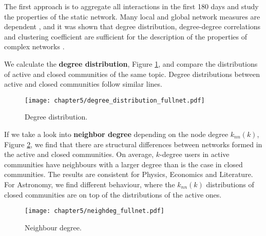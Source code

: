 The first approach is to aggregate all interactions in the first 180 days and study the properties of the static network. Many local and global network measures are dependent 
\cite{boccaletti2006complex}, and it was shown that degree distribution, degree-degree correlations and clustering coefficient are sufficient for the description of the properties of complex networks \cite{orsini2015quantifying}. 

We calculate the \textbf{degree distribution}, Figure \ref{fig:fullnetdeg}, and compare the distributions of active and closed communities of the same topic. Degree distributions between active and closed communities follow similar lines. 

\begin{figure}[ht]
	\centering
	\texttt{[image: chapter5/degree\_distribution\_fullnet.pdf]}
	\caption{Degree distribution.}
	\label{fig:fullnetdeg}
\end{figure}

If we take a look into \textbf{neighbor degree} depending on the node degree $k_{nn}(k)$, Figure \ref{fig:fullneighdeg}, we find that there are structural differences between networks formed in the active and closed communities. On average, $k$-degree users in active communities have neighbours with a larger degree than is the case in closed communities. The results are consistent for Physics, Economics and Literature. For Astronomy, we find different behaviour, where the $k_{nn}(k)$ distributions of closed communities are on top of the distributions of the active ones. 

\begin{figure}[!ht]
	\centering
	\texttt{[image: chapter5/neighdeg\_fullnet.pdf]}
	\caption{Neighbour degree.}
	\label{fig:fullneighdeg}
\end{figure}

